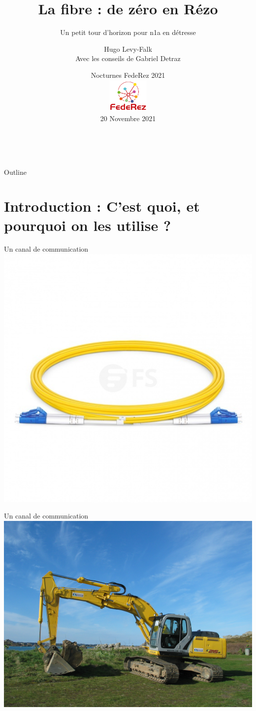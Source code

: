 \documentclass[aspectratio=149, 10pt, t]{beamer}
\title[La fibre, de zéro en Rézo]{%
	\textbf{\usebeamerfont{structure}%
		La fibre : de zéro en Rézo%
	}%
}
\subtitle{Un petit tour d'horizon pour n1a en détresse}
\author{%
	Hugo Levy-Falk\\
	Avec les conseils de Gabriel Detraz
} %
\date{%
	Nocturnes FedeRez 2021 \\[\medskipamount]
    \includegraphics[width=2cm]{images/federez}\\[\medskipamount]
	\textmd{20 Novembre 2021}%
}
\begin{document}
\begin{frame}[standout]{~}

	\titlepage%

\end{frame}


\begin{frame}[standout]{Outline}

	\medskip
	\tableofcontents

\end{frame}

\section{Introduction : C'est quoi, et pourquoi on les utilise ?}

\begin{frame}{Un canal de communication}
    \centering
    \includegraphics[height=\textheight]{images/une_fibre}
\end{frame}
\begin{frame}{Un canal de communication}
    \centering
    \includegraphics[width=0.7\linewidth]{images/Excavator_in_Brittany_France.JPG}
\end{frame}
\end{document}
